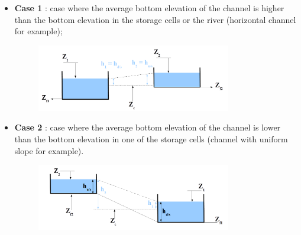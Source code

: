 \begin{itemize}
 \item \textbf{Case 1} : case where the average bottom elevation of the channel is higher than the bottom elevation in the storage cells or the river (horizontal channel for example);
   \begin{figure}[H]
    \begin{center}
     \includegraphics[width=0.8\textwidth]{Figures/Lchenal1.png}
    \end{center}
   \end{figure}
   \vspace{0.5cm}
 \item \textbf{Case 2} : case where the average bottom elevation of the channel is lower than the bottom elevation in one of the storage cells (channel with uniform slope for example).
   \begin{figure}[H]
    \begin{center}
     \includegraphics[width=0.8\textwidth]{Figures/Lchenal2.png}
    \end{center}
   \end{figure}
\end{itemize}

